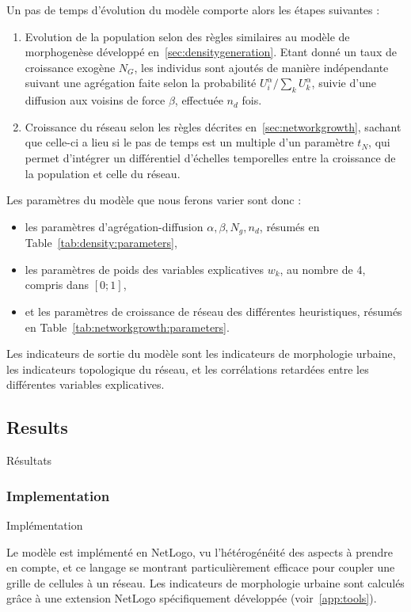 Un pas de temps d'évolution du modèle comporte alors les étapes suivantes :
\begin{enumerate}
	\item Evolution de la population selon des règles similaires au modèle de morphogenèse développé en~\ref{sec:densitygeneration}. Etant donné un taux de croissance exogène $N_G$, les individus sont ajoutés de manière indépendante suivant une agrégation faite selon la probabilité $U_i^\alpha/\sum_k U_k^\alpha$, suivie d'une diffusion aux voisins de force $\beta$, effectuée $n_d$ fois.
	\item Croissance du réseau selon les règles décrites en~\ref{sec:networkgrowth}, sachant que celle-ci a lieu si le pas de temps est un multiple d'un paramètre $t_N$, qui permet d'intégrer un différentiel d'échelles temporelles entre la croissance de la population et celle du réseau.
\end{enumerate}

Les paramètres du modèle que nous ferons varier sont donc :
\begin{itemize}
	\item les paramètres d'agrégation-diffusion $\alpha,\beta,N_g,n_d$, résumés en Table~\ref{tab:density:parameters},
	\item les paramètres de poids des variables explicatives $w_k$, au nombre de 4, compris dans $[0;1]$,
	\item et les paramètres de croissance de réseau des différentes heuristiques, résumés en Table~\ref{tab:networkgrowth:parameters}.
\end{itemize}

Les indicateurs de sortie du modèle sont les indicateurs de morphologie urbaine, les indicateurs topologique du réseau, et les corrélations retardées entre les différentes variables explicatives.


\subsection{Results}{Résultats}

\subsubsection{Implementation}{Implémentation}

Le modèle est implémenté en NetLogo, vu l'hétérogénéité des aspects à prendre en compte, et ce langage se montrant particulièrement efficace pour coupler une grille de cellules à un réseau. Les indicateurs de morphologie urbaine sont calculés grâce à une extension NetLogo spécifiquement développée (voir~\ref{app:tools}).


